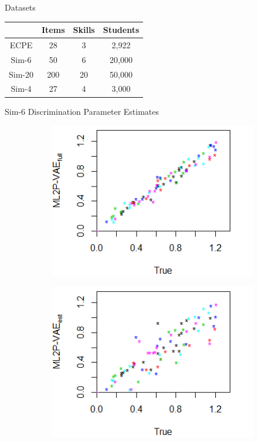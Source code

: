 \documentclass{beamer}
\theoremstyle{definition}
\begin{document}
\begin{frame}{Datasets}
  \begin{table}
    \centering
    \begin{tabular}{c|ccc}
      & Items & Skills & Students \\
      \hline
      ECPE & 28 & 3 & 2,922 \\ 
      Sim-6 & 50 & 6 & 20,000 \\
      Sim-20 & 200 & 20 & 50,000 \\
      Sim-4 & 27 & 4 & 3,000  
    \end{tabular}
  \end{table}
\end{frame}

\begin{frame}{Sim-6 Discrimination Parameter Estimates}
\begin{figure}[h]
\centering
    \begin{subfigure}{.32\textwidth}
      \centering
      \includegraphics[width=.9\linewidth]{../img/ml_journal_results/6skills/vae_full_disc_6skills.png}
    \end{subfigure}
    \begin{subfigure}{.32\textwidth}
      \centering
      \includegraphics[width=.9\linewidth]{../img/ml_journal_results/6skills/vae_est_disc_6skills.png}

\end{subfigure}
\end{figure}
\end{frame}
\end{document}
